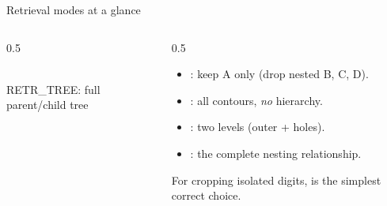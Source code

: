 \documentclass[10pt,aspectratio=169]{beamer}
\begin{document}
\begin{frame}{Retrieval modes at a glance}
  \begin{columns}[T]
    \begin{column}{0.5\textwidth}
    \begin{center}
    \\[2pt]{\scriptsize RETR\_TREE: full parent/child tree}
    \end{center}
    \end{column}
    \begin{column}{0.5\textwidth}
      \begin{itemize}
        \item {}: keep A only (drop nested B, C, D).
        \item {}: all contours, \emph{no} hierarchy.
        \item {}: two levels (outer + holes).
        \item {}: the complete nesting relationship.
      \end{itemize}
      \begin{goodbox}
        For cropping isolated digits,  is the simplest correct choice.
      \end{goodbox}
    \end{column}
  \end{columns}
\end{frame}
\end{document}
